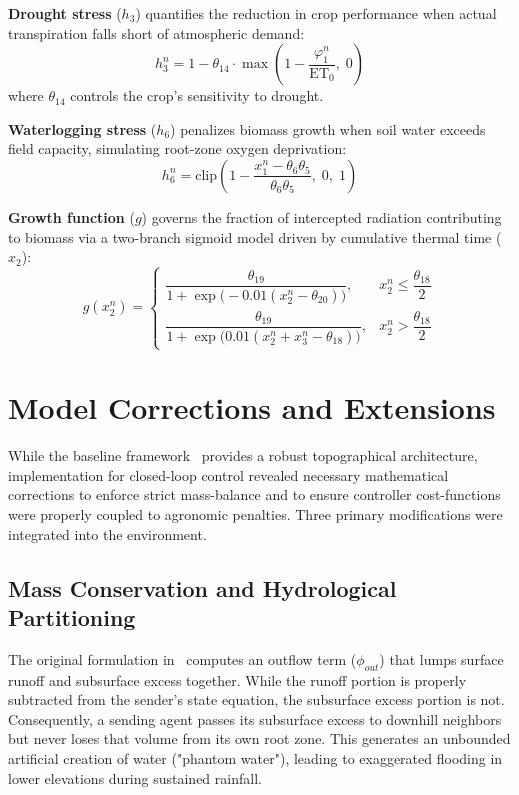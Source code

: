 \textbf{Drought stress} ($h_3$) quantifies the reduction in crop performance when actual transpiration falls short of atmospheric demand:
\begin{equation}
    h_3^n = 1 - \theta_{14} \cdot \max\!\left(1 - \frac{\varphi_1^n}{\text{ET}_0},\; 0\right)
    \label{eq:h3}
\end{equation}
where $\theta_{14}$ controls the crop's sensitivity to drought. 

\textbf{Waterlogging stress} ($h_6$) penalizes biomass growth when soil water exceeds field capacity, simulating root-zone oxygen deprivation:
\begin{equation}
    h_6^n = \text{clip}\!\left(1 - \frac{x_1^n - \theta_6 \theta_5}{\theta_6 \theta_5},\; 0,\; 1\right)
    \label{eq:h6}
\end{equation}

\textbf{Growth function} ($g$) governs the fraction of intercepted radiation contributing to biomass via a two-branch sigmoid model driven by cumulative thermal time ($x_2$):
\begin{equation}
    g(x_2^n) = 
    \begin{cases}
        \dfrac{\theta_{19}}{1 + \exp\!\bigl(-0.01(x_2^n - \theta_{20})\bigr)}, & x_2^n \leq \dfrac{\theta_{18}}{2} \\[14pt]
        \dfrac{\theta_{19}}{1 + \exp\!\bigl(0.01(x_2^n + x_3^n - \theta_{18})\bigr)}, & x_2^n > \dfrac{\theta_{18}}{2}
    \end{cases}
    \label{eq:growth}
\end{equation}


\section{Model Corrections and Extensions}
\label{sec:corrections}

While the baseline framework~\cite{Lopezjimenez2024} provides a robust topographical architecture, implementation for closed-loop control revealed necessary mathematical corrections to enforce strict mass-balance and to ensure controller cost-functions were properly coupled to agronomic penalties. Three primary modifications were integrated into the environment.

\subsection{Mass Conservation and Hydrological Partitioning}

The original formulation in~\cite{Lopezjimenez2024} computes an outflow term ($\phi_{out}$) that lumps surface runoff and subsurface excess together. While the runoff portion is properly subtracted from the sender's state equation, the subsurface excess portion is not. Consequently, a sending agent passes its subsurface excess to downhill neighbors but never loses that volume from its own root zone. This generates an unbounded artificial creation of water ("phantom water"), leading to exaggerated flooding in lower elevations during sustained rainfall. 

